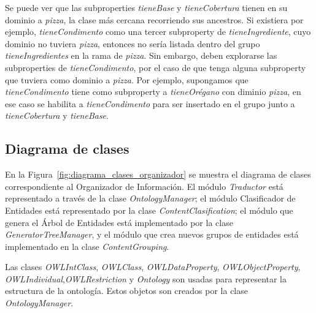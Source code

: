 Se puede ver que las subproperties \emph{tieneBase} y \emph{tieneCobertura} tienen en su dominio a \emph{pizza}, la clase más cercana recorriendo sus ancestros. Si existiera por ejemplo, \emph{tieneCondimento} como una tercer subproperty de \emph{tieneIngrediente}, cuyo dominio no tuviera \emph{pizza}, entonces no sería listada dentro del grupo \emph{tieneIngredientes} en la rama de \emph{pizza}. Sin embargo, deben explorarse las subproperties de \emph{tieneCondimento}, por el caso de que tenga alguna subproperty que tuviera como dominio a \emph{pizza}. Por ejemplo, supongamos que \emph{tieneCondimento} tiene como subproperty a \emph{tieneOrégano} con diminio \emph{pizza}, en ese caso se habilita a \emph{tieneCondimento} para ser insertado en el grupo junto a  \emph{tieneCobertura} y \emph{tieneBase}. 

\subsection{Diagrama de clases}
En la Figura~\ref{fig:diagrama_clases_organizador} se muestra el diagrama de clases correspondiente al Organizador de Información. El módulo \emph{Traductor} está representado a través de la clase \emph{OntologyManager}; el módulo Clasificador de Entidades está representado por la clase \emph{ContentClasification}; el módulo que genera el Árbol de Entidades está implementado por la clase \emph{GeneratorTreeManager}, y el módulo que crea nuevos grupos de entidades está implementado en la clase \emph{ContentGrouping}. 

Las clases \emph{OWLIntClass},  \emph{OWLClass},  \emph{OWLDataProperty},  \emph{OWLObjectProperty}, \emph{OWLIndividual},\emph{OWLRestriction} y  \emph{Ontology} son usadas para representar la estructura de la ontología. Estos objetos son creados por la clase  \emph{OntologyManager}. 

